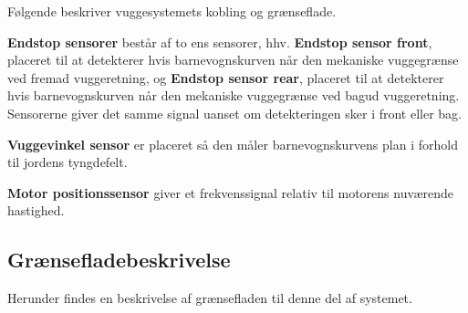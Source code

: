 Følgende beskriver vuggesystemets kobling og grænseflade.


\vspace{5mm} 

\textbf{Endstop sensorer} består af to ens sensorer, hhv. \textbf{Endstop sensor front}, placeret til at detekterer hvis barnevognskurven når den mekaniske vuggegrænse ved fremad vuggeretning, og \textbf{Endstop sensor rear}, placeret til at detekterer hvis barnevognskurven når den mekaniske vuggegrænse ved bagud vuggeretning. Sensorerne giver det samme signal uanset om detekteringen sker i front eller bag.

\vspace{5mm}

\textbf{Vuggevinkel sensor} er placeret så den måler barnevognskurvens plan i forhold til jordens tyngdefelt. 

\vspace{5mm}

\textbf{Motor positionssensor} giver et frekvenssignal relativ til motorens nuværende hastighed. 

\subsection*{Grænsefladebeskrivelse}
Herunder findes en beskrivelse af grænsefladen til denne del af systemet.

